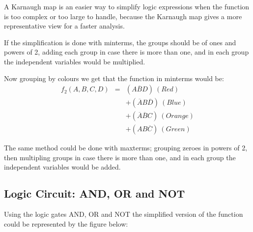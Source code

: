     A Karnaugh map is an easier way to simplify logic expressions when the function is too complex or too large to handle, because the Karnaugh map gives a more representative view for a faster analysis.

    If the simplification is done with minterms, the groups should be of ones and powers of 2, adding each group in case there is more than one, and in each group the independent variables would be multiplied.
    \begin{center}
        \begin{Karnaugh}
        \end{Karnaugh}
    \end{center}

    Now grouping by colours we get that the function in minterms would be:
    \begin{eqnarray*}
        f_2(A,B,C,D)&=&(A\overline{B}D)~(Red)\\
        &&+(\overline{A}B\overline{D})~(Blue)\\
        &&+(\overline{A}\overline{B}C)~(Orange)\\
        &&+(AB\overline{C})~(Green)
    \end{eqnarray*}

    The same method could be done with maxterms; grouping zeroes in powers of 2, then multipling groups in case there is more than one, and in each group the independent variables would be added.

    \subsection{\color{purple}Logic Circuit: AND, OR and NOT}

    Using the logic gates AND, OR and NOT the simplified version of the function could be represented by the figure below:

